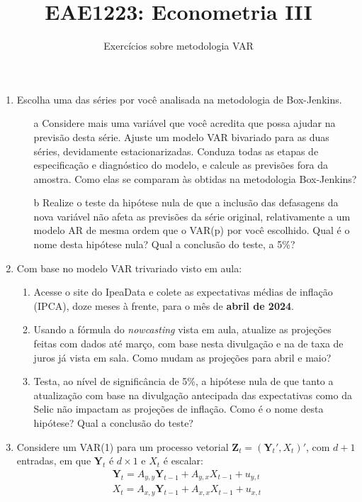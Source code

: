 \documentclass[10pt,a4paper]{article}
\title{\large EAE1223: Econometria III}
\author{\normalsize Exercícios sobre metodologia VAR}
\date{}
\begin{document}
	\maketitle
	\begin{enumerate}
\item Escolha uma das séries por você analisada na metodologia de Box-Jenkins.
\begin{enumerate}
	\item[a] Considere mais uma variável que você acredita que possa ajudar na previsão desta série. Ajuste um modelo VAR bivariado para as duas séries, devidamente estacionarizadas. Conduza todas as etapas de especificação e diagnóstico do modelo, e calcule as previsões fora da amostra. Como elas se comparam às obtidas na metodologia Box-Jenkins?
	\item[b] Realize o teste da hipótese nula de que a inclusão das defasagens da nova variável não afeta as previsões da série original, relativamente a um modelo AR de mesma ordem que o VAR(p) por você escolhido. Qual é o nome desta hipótese nula? Qual a conclusão do teste, a 5\%?
\end{enumerate}
\item Com base no modelo VAR trivariado visto em aula:
\begin{enumerate}
	\item Acesse o site do IpeaData e colete as expectativas médias de inflação (IPCA), doze meses à frente, para o mês de \textbf{abril de 2024}.
	\item Usando a fórmula do \textit{nowcasting} vista em aula, atualize as projeções feitas com dados até março, com base nesta divulgação e na de taxa de juros já vista em sala. Como mudam as projeções para abril e maio?
	\item Testa, ao nível de significância de 5\%, a hipótese nula de que tanto a atualização com base na divulgação antecipada das expectativas como da Selic não impactam as projeções de inflação. Como é o nome desta hipótese? Qual a conclusão do teste?
\end{enumerate}

\item Considere um VAR(1) para um processo vetorial $\boldsymbol{Z}_t = (\boldsymbol{Y}_t', X_t)'$, com $d+1$ entradas, em que $\boldsymbol{Y}_t$ é $d\times 1$ e $X_t$ é escalar:
\begin{align}
\boldsymbol{Y}_t = A_{y,y}\boldsymbol{Y}_{t-1} + A_{y,x}X_{t-1} + u_{y,t}  \label{eq_full}
\\
X_t = A_{x,y}\boldsymbol{Y}_{t-1} + A_{x,x}X_{t-1} + u_{x,t}  \label{eq_marginal}
\end{align}


\end{enumerate}
\end{document}

